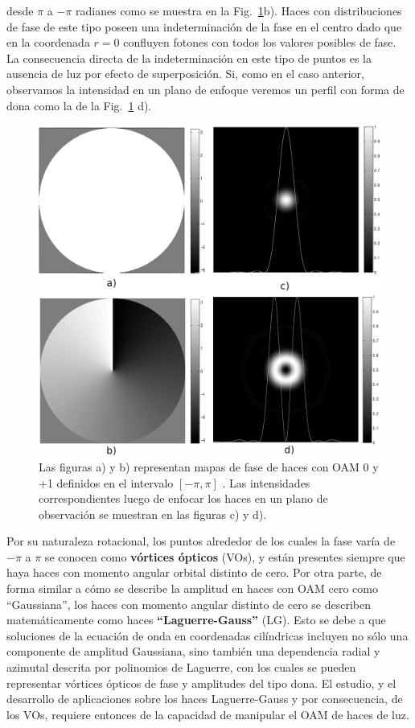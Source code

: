  desde $\pi$ a $-\pi$ radianes como se muestra  
en la Fig.~\ref{fig:oam_intro}b). Haces con distribuciones de fase de este tipo poseen una
indeterminación de la fase en el centro dado que en la
coordenada $r=0$ confluyen fotones con todos los valores posibles de fase. La
consecuencia directa de la indeterminación en este tipo de puntos es
la ausencia de luz por efecto de superposición. Si, como en el caso
anterior, observamos la intensidad en un plano de enfoque veremos un
perfil con forma de dona como la de la Fig.~\ref{fig:oam_intro} d). 
\begin{figure}[h!]
\centering
\includegraphics[scale=.33]{oam_Intro}
\caption[Comparación entre haces Gaussianos y haces Laguerre-Gauss]{ Las figuras a) y b) representan mapas de fase de haces con
  OAM 0 y +1 definidos en el intervalo $[- 
  \pi,\pi]$ . Las intensidades correspondientes luego de enfocar los haces en
  un plano de observación se muestran en las figuras c) y d).}
\label{fig:oam_intro}
\end{figure}

Por su naturaleza rotacional, los puntos alrededor de los cuales la fase
varía de $-\pi$  a $\pi$ se conocen como \textbf{vórtices ópticos} (\acrshort{VOs}), y
están presentes siempre que haya haces con momento angular 
orbital distinto de cero. Por otra parte, de forma similar a cómo se
describe la amplitud en haces con OAM cero como ``Gaussiana'', 
los haces con momento angular distinto de cero se describen
matemáticamente como haces \textbf{``Laguerre-Gauss''} (\acrshort{LG}). Esto se debe a que
soluciones de la ecuación de onda en coordenadas
cilíndricas incluyen no sólo una componente de amplitud Gaussiana, sino
también una dependencia radial y azimutal descrita por polinomios de
Laguerre, con los cuales se pueden representar vórtices ópticos de fase
y amplitudes del tipo dona.       
El estudio, y el desarrollo de aplicaciones sobre los haces Laguerre-Gauss y por consecuencia, de los VOs, requiere entonces de la
capacidad de manipular el OAM de haces de luz.

